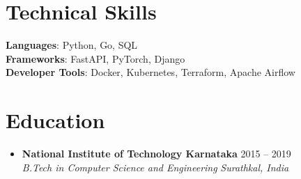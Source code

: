 \documentclass[letterpaper,11pt]{article}
\newcommand{\resumeSubheading}[4]{\item\textbf{#1} \hfill #2 \\ \textit{#3} \hfill \textit{#4}}
\newcommand{\resumeSubHeadingListStart}{\begin{itemize}[leftmargin=0.15in, label={}]}
\newcommand{\resumeSubHeadingListEnd}{\end{itemize}}
\begin{document}
\section{Technical Skills}
\begin{itemize}[leftmargin=0.15in, label={}]
  \small{\item{
    \textbf{Languages}{: Python, Go, SQL} \\
    \textbf{Frameworks}{: FastAPI, PyTorch, Django} \\
    \textbf{Developer Tools}{: Docker, Kubernetes, Terraform, Apache Airflow}
  }}
\end{itemize}

\section{Education}
\resumeSubHeadingListStart
  \resumeSubheading
    {National Institute of Technology Karnataka}{2015 -- 2019}
    {B.Tech in Computer Science and Engineering}{Surathkal, India}
\resumeSubHeadingListEnd
\end{document}

